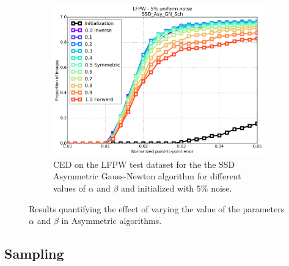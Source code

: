 \begin{figure}[h!]
	\begin{subfigure}{0.48\textwidth}
	    \includegraphics[width=\textwidth]{experiments/alpha/ced_ssd_asy_gn_5.png}
	    \caption{CED on the LFPW test dataset for the the SSD Asymmetric Gauss-Newton algorithm for different values of $\alpha$ and $\beta$ and initialized with $5\%$ noise.}
	    \label{fig:ced_po_inv_gn}
	\end{subfigure}
	\label{fig:alpha}
	\caption{Results quantifying the effect of varying the value of the parameters $\alpha$ and $\beta$ in Asymmetric algorithms.}
\end{figure}



\subsection{Sampling}

